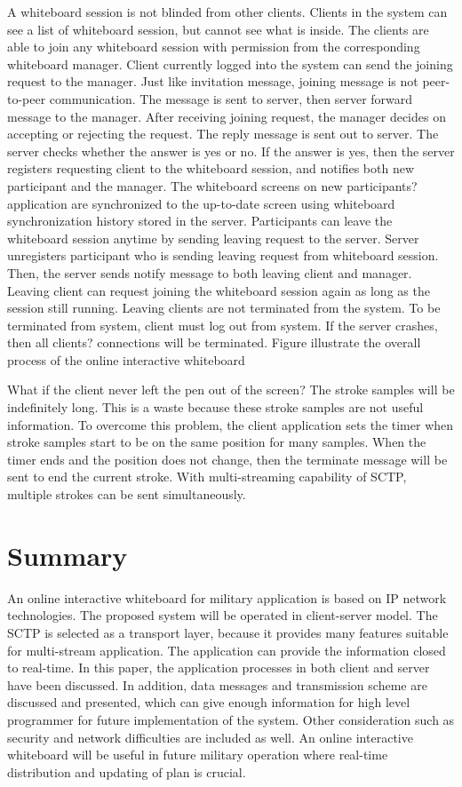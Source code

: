 \documentclass[conference]{IEEEtran}
\begin{document}
A whiteboard session is not blinded from other clients. Clients in the system can see a list of whiteboard session, but cannot see what is inside. The clients are able to join any whiteboard session with permission from the corresponding whiteboard manager. Client currently logged into the system can send the joining request to the manager. Just like invitation message, joining message is not peer-to-peer communication. The message is sent to server, then server forward message to the manager. After receiving joining request, the manager decides on accepting or rejecting the request. The reply message is sent out to server. The server checks whether the answer is yes or no. If the answer is yes, then the server registers requesting client to the whiteboard session, and notifies both new participant and the manager. The whiteboard screens on new participants? application are synchronized to the up-to-date screen using whiteboard synchronization history stored in the server.
Participants can leave the whiteboard session anytime by sending leaving request to the server. Server unregisters participant who is sending leaving request from whiteboard session. Then, the server sends notify message to both leaving client and manager. Leaving client can request joining the whiteboard session again as long as the session still running. Leaving clients are not terminated from the system. To be terminated from system, client must log out from system. If the server crashes, then all clients? connections will be terminated. Figure  illustrate the overall process of the online interactive whiteboard

What if the client never left the pen out of the screen? The stroke samples will be indefinitely long. This is a waste because these stroke samples are not useful information. To overcome this problem, the client application sets the timer when stroke samples start to be on the same position for many samples. When the timer ends and the position does not change, then the terminate message will be sent to end the current stroke. With multi-streaming capability of SCTP, multiple strokes can be sent simultaneously.

\section{Summary}
An online interactive whiteboard for military application is based on IP network technologies. 
The proposed system will be operated in client-server model. 
The SCTP is selected as a transport layer, because it provides many features suitable for multi-stream application. 
The application can provide the information closed to real-time. 
In this paper, the application processes in both client and server have been discussed. 
In addition, data messages and transmission scheme are discussed and presented, which can give enough information for high level programmer for future implementation of the system. 
Other consideration such as security and network difficulties are included as well. 
An online interactive whiteboard will be useful in future military operation where real-time distribution and updating of plan is crucial.
\end{document}
